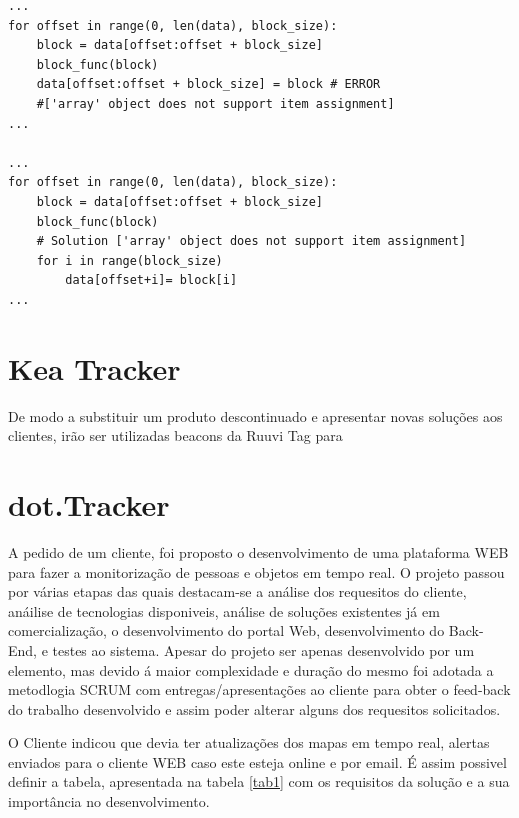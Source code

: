 \begin{verbatim}
...
for offset in range(0, len(data), block_size):
    block = data[offset:offset + block_size]
    block_func(block)
    data[offset:offset + block_size] = block # ERROR 
    #['array' object does not support item assignment]
...

...
for offset in range(0, len(data), block_size):
    block = data[offset:offset + block_size]
    block_func(block)
    # Solution ['array' object does not support item assignment]
    for i in range(block_size)
        data[offset+i]= block[i]
...
 \end{verbatim}

\section {Kea Tracker}

\par De modo a substituir um produto descontinuado e apresentar novas soluções aos clientes, irão ser utilizadas beacons da Ruuvi Tag para



\section {dot.Tracker}
\par
A pedido de um cliente, foi proposto o desenvolvimento de uma plataforma WEB para fazer a monitorização de pessoas e objetos em tempo real. O projeto passou por várias  etapas das quais destacam-se a análise dos requesitos do cliente, anáilise de tecnologias disponiveis, análise de soluções existentes já em comercialização, o desenvolvimento do portal Web, desenvolvimento do Back-End, e testes ao sistema. Apesar do projeto ser apenas desenvolvido por um elemento, mas devido á maior complexidade e duração do mesmo foi adotada a metodlogia SCRUM com entregas/apresentações ao cliente para obter o feed-back do trabalho desenvolvido e assim poder alterar alguns dos requesitos solicitados.
\par O Cliente indicou que devia ter atualizações dos mapas em tempo real, alertas enviados para o cliente WEB caso este esteja online e por email.
É assim possivel definir a tabela, apresentada na tabela \ref{tab1} com os requisitos da solução e a sua importância no desenvolvimento.

